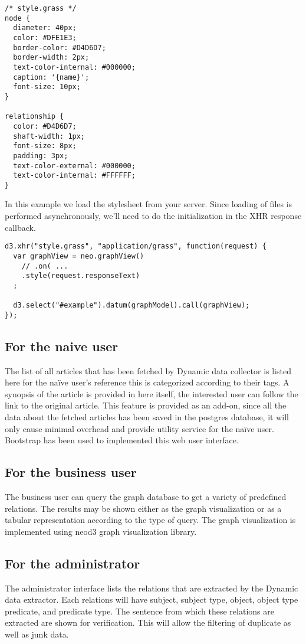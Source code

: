 \begin{lstlisting}
/* style.grass */
node {
  diameter: 40px;
  color: #DFE1E3;
  border-color: #D4D6D7;
  border-width: 2px;
  text-color-internal: #000000;
  caption: '{name}';
  font-size: 10px;
}

relationship {
  color: #D4D6D7;
  shaft-width: 1px;
  font-size: 8px;
  padding: 3px;
  text-color-external: #000000;
  text-color-internal: #FFFFFF;
}
\end{lstlisting}
\par In this example we load the stylesheet from your server. Since loading of files is performed asynchronously, we'll need to do the initialization in the XHR response callback.

\begin{lstlisting}
d3.xhr("style.grass", "application/grass", function(request) {
  var graphView = neo.graphView()
    // .on( ...
    .style(request.responseText)
  ;

  d3.select("#example").datum(graphModel).call(graphView);
});
\end{lstlisting}
\subsection{For the naive user}
\par 
The list of all articles that has been fetched by Dynamic data collector is listed here for the naïve user’s reference this is categorized according to their tags.  A synopsis of the article is provided in here itself, the interested user can follow the link to the original article. This feature is provided as an add-on, since all the data about the fetched articles has been saved in the postgres database, it will only cause minimal overhead and provide utility service for the naïve user. Bootstrap has been used to implemented this web user interface.
\subsection{For the business user}
\par The business user can query the graph database to get a variety of predefined relations. The results may be shown either as the graph visualization or as a tabular representation according to the type of query. The graph visualization is implemented using neod3 graph visualization library. 
\subsection{For the administrator}
\par The administrator interface lists the relations that are extracted by the Dynamic data extractor. Each relations will have subject, subject type, object, object type predicate, and predicate type. The sentence from which these relations are extracted are shown for verification. This will allow the filtering of duplicate as well as junk data.